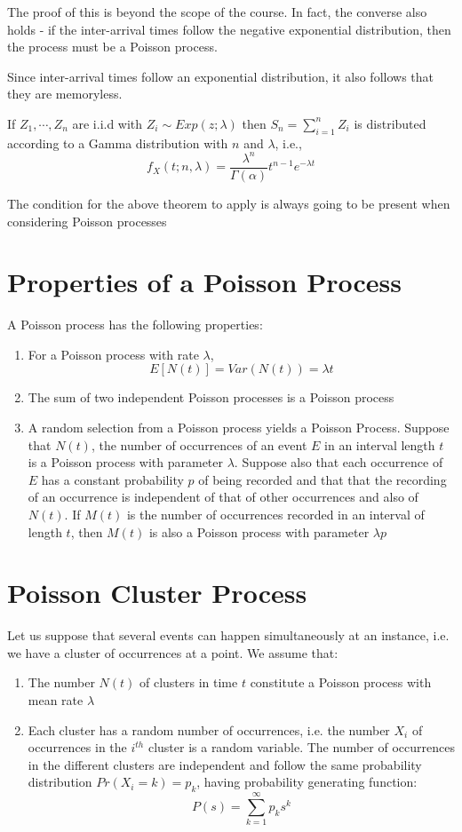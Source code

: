 \documentclass[12pt,letterpaper]{book}
\theoremstyle{definition}
\begin{document}
The proof of this is beyond the scope of the course. In fact, the converse also holds - if the inter-arrival times follow the negative exponential distribution, then the process must be a Poisson process.

Since inter-arrival times follow an exponential distribution, it also follows that they are memoryless.

\begin{lemma}
  If $Z_1, \cdots, Z_n$ are i.i.d with $Z_i \sim Exp(z;\lambda)$ then $S_n = \sum_{i = 1}^{n}  Z_i$ is distributed according to a Gamma distribution with $n$ and $\lambda$, i.e.,
  \[f_X(t;n,\lambda) = \frac{\lambda^n}{\Gamma (\alpha)} t^{n-1} e^{-\lambda t}\]
\end{lemma}

The condition for the above theorem to apply is always going to be present when considering Poisson processes

\section{Properties of a Poisson Process}

A Poisson process has the following properties:

\begin{enumerate}
  \item For a Poisson process with rate $\lambda$, 
    \[E[N(t)] = Var(N(t)) = \lambda t\]
  \item The sum of two independent Poisson processes is a Poisson process
  \item A random selection from a Poisson process yields a Poisson Process. Suppose that $N(t)$, the number of occurrences of an event $E$ in an interval length $t$ is a Poisson process with parameter $\lambda$. Suppose also that each occurrence of $E$ has a constant probability $p$ of being recorded and that that the recording of an occurrence is independent of that of other occurrences and also of $N(t)$. If $M(t)$ is the number of occurrences recorded in an interval of length $t$, then $M(t)$ is also a Poisson process with parameter $\lambda p$
\end{enumerate}

\section{Poisson Cluster Process}

Let us suppose that several events can happen simultaneously at an instance, i.e. we have a cluster of occurrences at a point. We assume that:
\begin{enumerate}
  \item The number $N(t)$ of clusters in time $t$ constitute a Poisson process with mean rate $\lambda$
  \item Each cluster has a random number of occurrences, i.e. the number $X_i$ of occurrences in the $i^{th}$ cluster is a random variable. The number of occurrences in the different clusters are independent and follow the same probability distribution $Pr(X_i = k) = p_k$, having probability generating function:
    \[P(s) = \sum_{k = 1}^{\infty} p_ks^k\]
\end{enumerate}
\end{document}
